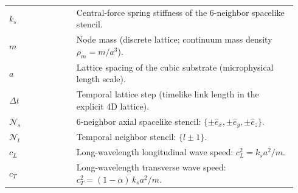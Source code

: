 \begin{center}
\begin{tabular}{p{0.22\linewidth} p{0.72\linewidth}}
$k_s$ & Central-force spring stiffness of the 6-neighbor spacelike stencil.\\
$m$ & Node mass (discrete lattice; continuum mass density $\rho_m=m/a^3$).\\
$a$ & Lattice spacing of the cubic substrate (microphysical length scale).\\
$\Delta t$ & Temporal lattice step (timelike link length in the explicit 4D lattice).\\
$\mathcal{N}_s$ & 6-neighbor axial spacelike stencil: $\{\pm\hat{e}_x,\pm\hat{e}_y,\pm\hat{e}_z\}$.\\
$\mathcal{N}_t$ & Temporal neighbor stencil: $\{l\pm 1\}$.\\
$c_L$ & Long-wavelength longitudinal wave speed: $c_L^2=k_s a^2/m$.\\
$c_T$ & Long-wavelength transverse wave speed: $c_T^2=(1-\alpha)\,k_s a^2/m$.\\
\end{tabular}
\end{center}
